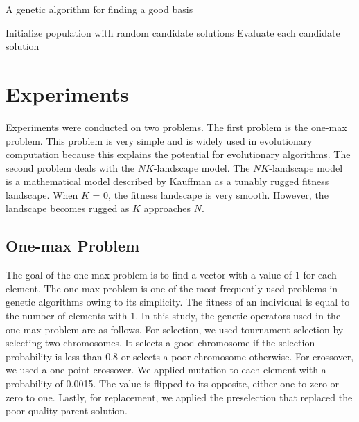 \begin{algorithm}[!ht] %
\caption{A genetic algorithm for finding a good basis}
Initialize population with random candidate solutions\;
Evaluate each candidate solution\;
\end{algorithm}

\section{Experiments} \label{section:experiments}
Experiments were conducted on two problems.
The first problem is the one-max problem.
This problem is very simple and is widely used in evolutionary computation because this explains the potential for evolutionary algorithms.
The second problem deals with the $ NK $-landscape model.
The $ NK $-landscape model~\cite{kauffman1989nk} is a mathematical model described by Kauffman as a tunably rugged fitness landscape.
When $ K $ = 0, the fitness landscape is very smooth.
However, the landscape becomes rugged as $ K $ approaches $ N $.

\subsection{One-max Problem} \label{section:onemax}
The goal of the one-max problem is to find a vector with a value of $ 1 $ for each element.
The one-max problem is one of the most frequently used problems in genetic algorithms owing to its simplicity.
The fitness of an individual is equal to the number of elements with $ 1 $.
In this study, the genetic operators used in the one-max problem are as follows.
For selection, we used tournament selection by selecting two chromosomes.
It selects a good chromosome if the selection probability is less than 0.8 or selects a poor chromosome otherwise.
For crossover, we used a one-point crossover.
We applied mutation to each element with a probability of 0.0015.
The value is flipped to its opposite, either one to zero or zero to one.
Lastly, for replacement, we applied the preselection that replaced the poor-quality parent solution.



